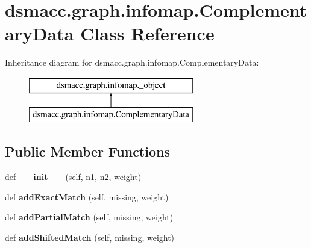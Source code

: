 \hypertarget{classdsmacc_1_1graph_1_1infomap_1_1ComplementaryData}{}\section{dsmacc.\+graph.\+infomap.\+Complementary\+Data Class Reference}
\label{classdsmacc_1_1graph_1_1infomap_1_1ComplementaryData}
Inheritance diagram for dsmacc.\+graph.\+infomap.\+Complementary\+Data\+:\begin{figure}[H]
\begin{center}
\leavevmode
\includegraphics[height=2.000000cm]{classdsmacc_1_1graph_1_1infomap_1_1ComplementaryData}
\end{center}
\end{figure}
\subsection*{Public Member Functions}
\begin{DoxyCompactItemize}
\item 
\mbox{\label{classdsmacc_1_1graph_1_1infomap_1_1ComplementaryData_ad306a22c8607cc3d31d3578ec510acd3}} 
def {\bfseries \+\_\+\+\_\+init\+\_\+\+\_\+} (self, n1, n2, weight)
\item 
\mbox{\label{classdsmacc_1_1graph_1_1infomap_1_1ComplementaryData_a17090457031af5851d5704f8e4e1bef9}} 
def {\bfseries add\+Exact\+Match} (self, missing, weight)
\item 
\mbox{\label{classdsmacc_1_1graph_1_1infomap_1_1ComplementaryData_a712bb7565a198aeed3485919f4570b19}} 
def {\bfseries add\+Partial\+Match} (self, missing, weight)
\item 
\mbox{\label{classdsmacc_1_1graph_1_1infomap_1_1ComplementaryData_a7b2ad68a3f73c80e40f0b1266b0bc245}} 
def {\bfseries add\+Shifted\+Match} (self, missing, weight)
\end{DoxyCompactItemize}

